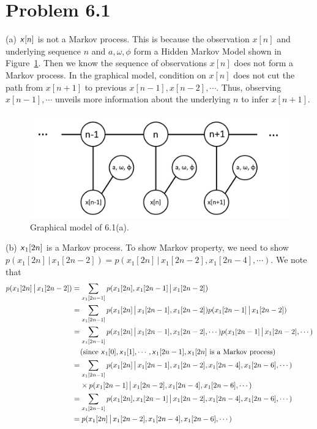 \documentclass{article}
\newcommand{\s}[1]{\textsf{\textit{#1}}}
\newcommand{\qeds}{\hfill\qedsymbol}
\begin{document}
\section*{Problem 6.1}
%
(a) $\s{x}[n]$ is not a Markov process. This is because the observation $x[n]$ and underlying
sequence $n$ and $a, \omega, \phi$ form a Hidden Markov Model shown in Figure~\ref{f:61a}.
%
Then we know the sequence of observations $x[n]$ does not form a Markov process. In the graphical
model, condition on $x[n]$ does not cut the path from $x[n+1]$
to previous $x[n-1], x[n-2], \cdots$.
%
Thus, observing $x[n-1], \cdots$ unveils more information about the underlying $n$ to infer
$x[n+1]$. \qeds
\\
\begin{figure}[h!]
  \centering
  \vspace{-0.3cm}
  \includegraphics[width=0.5\columnwidth]{61a.png}
    \vspace{-0.1cm}
  \caption{Graphical model of 6.1(a).}
  \label{f:61a}
\end{figure}

\noindent
(b) $\s{x}_1[2n]$ is a Markov process. To show Markov property, we need to show
$p(x_1[2n] \,\big|\, x_1[2n - 2]) = p(x_1[2n] \,\big|\, x_1[2n - 2], x_1[2n -4], \cdots)$. We note that
\begin{align*}
p(x_1[2n] \,\big|\, x_1[2n - 2])	 &=
\sum_{x_1[2n - 1]} p(x_1[2n], x_1[2n-1] \,\big|\, x_1[2n - 2])\\
&= \sum_{x_1[2n - 1]} p(x_1[2n] \,\big|\, x_1[2n-1], x_1[2n-2])
p(x_1[2n-1] \,\big|\, x_1[2n-2])\\
&= \sum_{x_1[2n - 1]} p(x_1[2n] \,\big|\, x_1[2n-1], x_1[2n-2], \cdots)
p(x_1[2n-1] \,\big|\, x_1[2n-2], \cdots)\\
&\;\;\;\;\text{(since $\s{x}_1[0], \s{x}_1[1], \cdots, \s{x}_1[2n-1], \s{x}_1[2n]$ is a Markov process)}\\
&= \sum_{x_1[2n - 1]} p(x_1[2n] \,\big|\, x_1[2n-1], x_1[2n-2], x_1[2n-4], x_1[2n-6], \cdots)\\
&\;\;\;\; \times p(x_1[2n-1] \,\big|\, x_1[2n-2], x_1[2n-4], x_1[2n-6], \cdots)\\
&= \sum_{x_1[2n - 1]} p(x_1[2n], x_1[2n-1] \,\big|\, x_1[2n-2], x_1[2n-4], x_1[2n-6], \cdots)\\
& = p(x_1[2n] \,\big|\, x_1[2n-2], x_1[2n-4], x_1[2n-6], \cdots)
\end{align*} \qeds
\end{document}
